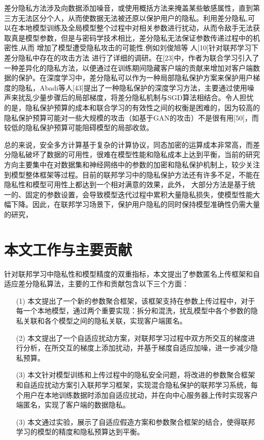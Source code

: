 差分隐私方法涉及向数据添加噪音，或使用概括方法来掩盖某些敏感属性，直到第三方无法区分个人，从而使数据无法被还原以保护用户的隐私。利用差分隐私,可以在本地模型训练及全局模型整个过程中对相关参数进行扰动，从而令敌手无法获取真是模型参数，但是与密码学技术相比，差分隐私无法保证参数传递过程中的机密性,从而 增加了模型遭受隐私攻击的可能性.例如刘俊旭等 人[10]针对联邦学习下差分隐私中存在的攻击方法 进行了详细的调研。在[23]中，作者为联合学习引入了一种差异化的隐私方法，以便通过在训练期间隐藏客户端的贡献来增加对客户端数据的保护。在深度学习中，差分隐私可以作为一种局部隐私保护方案来保护用户梯度的隐私，Abadi等人[43]提出了一种隐私保护的深度学习方法，主要通过使用噪声来扰乱少量步骤后的局部梯度，将差分隐私机制与SGD算法相结合。令人担忧的是，隐私保护预算的成本和联合学习的有效性之间的权衡是困难的，因为较高的隐私保护预算可能对一些大规模的攻击（如基于GAN的攻击）不是很有用[50]，而较低的隐私保护预算可能阻碍模型的局部收敛。


总的来说，安全多方计算基于复杂的计算协议，同态加密的运算成本非常高，而差分隐私破坏了数据的可用性，很难在模型性能和隐私成本上达到平衡，当前的研究方向主要集中在对数据集和神经网络中的参数的加密和隐私保护机制上，较少关注到模型整体框架等过程。目前的联邦学习中的隐私保护方法还有许多不足，不能在隐私性和模型可用性上都达到一个相对满意的效果，此外， 大部分方法是基于统一的、固定的参数设置，会导致模型迭代过程中累积大量隐私损失，使模型性能大幅下降。因此，在联邦学习场景下，保护用户隐私的同时保持模型准确性仍需大量的研究，


\section{本文工作与主要贡献}
针对联邦学习中隐私性和模型精度的双重指标，本文提出了参数匿名上传框架和自适应差分隐私算法，主要的工作和贡献包含以下三个方面：
\begin{enumerate}
\item [(1)] 本文提出了一个新的参数聚合框架，该框架支持在参数上传过程中，对于每一个本地模型，通过两个重要实现：拆分和混洗，扰乱模型中各个参数的隐私关联和各个模型之间的隐私关联，实现客户端匿名。
\item [(2)] 本文提出了一个自适应扰动方案，对联邦学习过程中双方所交互的梯度进行分析，在所交互的梯度上添加扰动，并基于梯度自适应加噪，进一步减少隐私预算。
\item [(3)] 本文针对模型训练和上传过程中的隐私安全问题，将改进的参数聚合框架和自适应扰动方案引入联邦学习框架，实现混合隐私保护的联邦学习系统，每个用户在本地训练数据时添加自适应扰动，并在向中心服务器上传时实现客户端匿名，实现了客户端的数据隐私。
\item [(3)] 本文通过实验，展示了自适应假造方案和参数聚合框架的结合，使得联邦学习的模型的精度和隐私预算达到平衡。
\end{enumerate}

